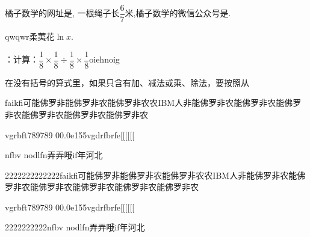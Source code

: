 \documentclass[answers]{BHCexam}
\begin{document}
\begin{groups}
\begin{questions}[]
\question[] 橘子数学的网址是, 一根绳子长\( \dfrac{6}{7}\)米,橘子数学的微信公众号是. 
\begin{solution}{4cm}
\methodonly qwqwr柔荑花$\ln{x}$.
\end{solution}
\question[] ：计算：\( \dfrac{1}{8}\times \dfrac{1}{8}\div \dfrac{1}{8}\times \dfrac{1}{8}\)oiehnoig 
\begin{solution}{4cm}
\methodonly 在没有括号的算式里，如果只含有加、减法或乘、除法，要按照从
\end{solution}
 
\end{questions}

\begin{questions}[t]
\question[] faikfi可能佛罗非能佛罗非农能佛罗非农农IBM人非能佛罗非农能佛罗非农能佛罗非农能佛罗非农能佛罗非农能佛罗非农 
\begin{subquestions}
 \subquestion vgrbft789789 
\subquestion 00.0e155vgdrfbrfe[[[[[[ 
 
\end{subquestions}
\begin{solution}{8cm}
\methodonly nfbv nodlfn弄弄哦if年河北 
\end{solution}
\question[] 2222222222222faikfi可能佛罗非能佛罗非农能佛罗非农农IBM人非能佛罗非农能佛罗非农能佛罗非农能佛罗非农能佛罗非农能佛罗非农 
\begin{subquestions}
 \subquestion vgrbft789789 
\subquestion 00.0e155vgdrfbrfe[[[[[[ 
 
\end{subquestions}
\begin{solution}{8cm}
\methodonly 2222222222nfbv nodlfn弄弄哦if年河北 
\end{solution}
 
\end{questions}

\end{groups}
\end{document}
